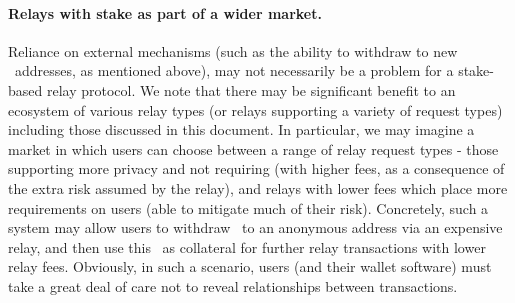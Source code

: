 \paragraph{Relays with stake as part of a wider market.} Reliance on external mechanisms (such as the ability to withdraw to new \ethereum~addresses, as mentioned above), may not necessarily be a problem for a stake-based relay protocol. We note that there may be significant benefit to an ecosystem of various relay types (or relays supporting a variety of request types) including those discussed in this document. In particular, we may imagine a market in which users can choose between a range of relay request types - those supporting more privacy and not requiring \ether (with higher fees, as a consequence of the extra risk assumed by the relay), and relays with lower fees which place more requirements on users (able to mitigate much of their risk). Concretely, such a system may allow users to withdraw \ether~to an anonymous address via an expensive relay, and then use this \ether~as collateral for further relay transactions with lower relay fees. Obviously, in such a scenario, users (and their wallet software) must take a great deal of care not to reveal relationships between transactions.

